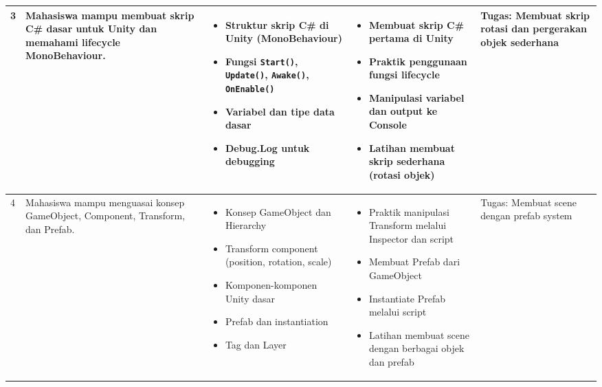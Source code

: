 \documentclass[a4paper,12pt]{article}
\begin{document}
\begin{longtable}{|p{0.8cm}|p{3.5cm}|p{4cm}|p{4cm}|p{2.5cm}|}
3 & Mahasiswa mampu membuat skrip C\# dasar untuk Unity dan memahami lifecycle MonoBehaviour. & 
\begin{itemize}[leftmargin=*,nosep]
\item Struktur skrip C\# di Unity (MonoBehaviour)
\item Fungsi \texttt{Start()}, \texttt{Update()}, \texttt{Awake()}, \texttt{OnEnable()}
\item Variabel dan tipe data dasar
\item Debug.Log untuk debugging
\end{itemize} & 
\begin{itemize}[leftmargin=*,nosep]
\item Membuat skrip C\# pertama di Unity
\item Praktik penggunaan fungsi lifecycle
\item Manipulasi variabel dan output ke Console
\item Latihan membuat skrip sederhana (rotasi objek)
\end{itemize} & 
Tugas: Membuat skrip rotasi dan pergerakan objek sederhana \\
\hline

4 & Mahasiswa mampu menguasai konsep GameObject, Component, Transform, dan Prefab. & 
\begin{itemize}[leftmargin=*,nosep]
\item Konsep GameObject dan Hierarchy
\item Transform component (position, rotation, scale)
\item Komponen-komponen Unity dasar
\item Prefab dan instantiation
\item Tag dan Layer
\end{itemize} & 
\begin{itemize}[leftmargin=*,nosep]
\item Praktik manipulasi Transform melalui Inspector dan script
\item Membuat Prefab dari GameObject
\item Instantiate Prefab melalui script
\item Latihan membuat scene dengan berbagai objek dan prefab
\end{itemize} & 
Tugas: Membuat scene dengan prefab system \\
\hline


\end{longtable}
\end{document}
